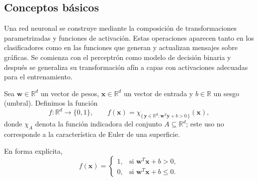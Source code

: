 \subsection{Conceptos básicos}
Una red neuronal se construye mediante la composición de transformaciones parametrizadas y funciones de activación. Estas operaciones aparecen tanto en los clasificadores como en las funciones que generan y actualizan mensajes sobre gráficas. Se comienza con el perceptrón como modelo de decisión binaria y después se generaliza su transformación afín a capas con activaciones adecuadas para el entrenamiento.

\begin{definition}[Perceptrón]
\label{def:perceptron}
    Sea $\mathbf{w} \in \mathbb{R}^d$ un vector de pesos, $\mathbf{x} \in \mathbb{R}^d$ un vector de entrada y $b \in \mathbb{R}$ un sesgo (umbral). Definimos la función
    \[
        f:\mathbb{R}^d \to \{0,1\}, \qquad f(\mathbf{x}) = \chi_{\{\, \mathbf{y} \in \mathbb{R}^d : \mathbf{w}^T \mathbf{y} + b > 0 \,\}}(\mathbf{x}),
    \]
    donde $\chi_{A}$ denota la función indicadora del conjunto $A \subseteq \mathbb{R}^d$; este uso no corresponde a la característica de Euler de una superficie.

    En forma explícita,
    \[
        f(\mathbf{x}) = \begin{cases}
            1, & \text{si } \mathbf{w}^T \mathbf{x} + b > 0,    \\[6pt]
            0, & \text{si } \mathbf{w}^T \mathbf{x} + b \leq 0.
        \end{cases}
    \]
\end{definition}


